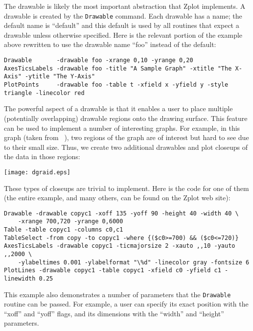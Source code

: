 The drawable is likely the most important abstraction that Zplot implements. A
drawable is created by the \texttt{Drawable} command. Each drawable has a
name; the default name is ``default'' and this default is used by all routines
that expect a drawable unless otherwise specified. Here is the relevant
portion of the example above rewritten to use the drawable name ``foo''
instead of the default:

\begin{verbatim}
Drawable       -drawable foo -xrange 0,10 -yrange 0,20
AxesTicsLabels -drawable foo -title "A Sample Graph" -xtitle "The X-Axis" -ytitle "The Y-Axis"
PlotPoints     -drawable foo -table t -xfield x -yfield y -style triangle -linecolor red
\end{verbatim}

The powerful aspect of a drawable is that it enables a user to place multiple
(potentially overlapping) drawable regions onto the drawing surface. This
feature can be used to implement a number of interesting graphs. For example,
in this graph (taken from ~\cite{SivathanuEtAl04-DGRAID}), two regions of the
graph are of interest but hard to see due to their small size. Thus, we create
two additional drawables and plot closeups of the data in those regions:

\texttt{[image: dgraid.eps]}

These types of closeups are trivial to implement. Here is the code for one of
them (the entire example, and many others, can be found on the Zplot web
site):

\begin{small}
\begin{verbatim}
Drawable -drawable copyc1 -xoff 135 -yoff 90 -height 40 -width 40 \
    -xrange 700,720 -yrange 0,6000
Table -table copyc1 -columns c0,c1
TableSelect -from copy -to copyc1 -where {($c0>=700) && ($c0<=720)}
AxesTicsLabels -drawable copyc1 -ticmajorsize 2 -xauto ,,10 -yauto ,,2000 \
    -ylabeltimes 0.001 -ylabelformat "\%d" -linecolor gray -fontsize 6
PlotLines -drawable copyc1 -table copyc1 -xfield c0 -yfield c1 -linewidth 0.25
\end{verbatim}
\end{small}

This example also demonstrates a number of parameters that the
\texttt{Drawable} routine can be passed. For example, a user can specify its
exact position with the ``xoff'' and ``yoff'' flags, and its dimensions with
the ``width'' and ``height'' parameters. 



